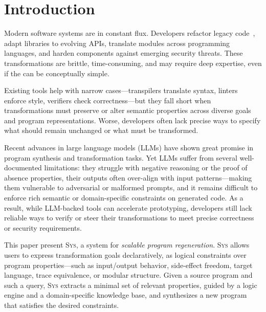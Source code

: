 \documentclass[sigplan]{acmart}
\newcommand{\sys}{{\scshape Sys}\xspace}
\begin{document}
\section{Introduction}

Modern software systems are in constant flux.
Developers refactor legacy code~\cite{Fowler99,Mens04},
adapt libraries to evolving APIs,
translate modules across programming languages,
and harden components against emerging security threats.
These transformations are brittle, time-consuming, and may require deep expertise,
even if the can be conceptually simple.

Existing tools help with narrow cases---transpilers translate syntax, linters
enforce style, verifiers check correctness---but they fall short when
transformations must preserve or alter semantic properties across diverse goals
and program representations. 
Worse, developers often lack precise ways to
specify what should remain unchanged or what must be transformed.

Recent advances in large language models (LLMs) have shown great promise in
program synthesis and transformation tasks.
Yet LLMs suffer from several well-documented limitations:
they struggle with negative reasoning or the proof of absence properties, their outputs often over-align with input patterns—making
them vulnerable to adversarial or malformed prompts, and it
remains difficult to enforce rich semantic or domain-specific constraints on
generated code.
As a result, while LLM-backed tools can
accelerate prototyping, developers still lack reliable ways to verify or steer
their transformations to meet precise correctness or security requirements.



This paper present \sys, a system for \emph{scalable program regeneration}.
\sys allows users
to express transformation goals declaratively, as logical constraints over
program properties---such as input/output behavior, side-effect freedom, target
language, trace equivalence, or modular structure. Given a source program and
such a query, \sys extracts a minimal set of relevant properties, guided by a
logic engine and a domain-specific knowledge base, and synthesizes a new
program that satisfies the desired constraints.
\end{document}
